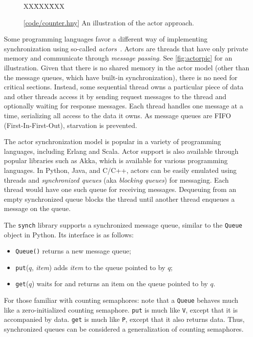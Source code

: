 \documentclass{report}
\newcommand{\harmonysource}[1]{
\begin{tabbing}
XX\=XXX\=XXX\kill
    
\end{tabbing}
}
\newcommand{\harmonylink}[1]{%
[\href{https://harmony.cs.cornell.edu/#1}{\underline{#1}}]%
}
\newenvironment{code}{
\tcolorbox
}{
\endtcolorbox
}
\begin{document}
\begin{figure}
\begin{code}
\harmonysource{counter}
\end{code}
\caption{\harmonylink{code/counter.hny} An illustration of the actor approach.}
\label{fig:actor}
\end{figure}

Some programming languages favor a different way of implementing
synchronization using so-called \emph{actors}~\cite{HBS73,Agha86}.  Actors are
threads that have only private memory and communicate through
\emph{message passing}.
See \autoref{fig:actorpic} for an illustration.
Given that there is no shared memory in the actor model (other than the message
queues, which have built-in synchronization), there is no need
for critical sections.  Instead, some sequential thread owns a particular
piece of data and other threads access it by sending request messages
to the thread and optionally waiting for response messages.  Each thread
handles one message at a time, serializing all access to the data it owns.
As message queues are FIFO (First-In-First-Out), starvation is prevented.

The actor synchronization model is popular in a variety of programming
languages, including Erlang and Scala.  Actor support is also available
through popular libraries such as Akka, which is available for various
programming languages.  In Python, Java, and C/C++,
actors can be easily emulated using threads and \emph{synchronized queues}
%
(aka \emph{blocking queues})
%
for messaging.
Each thread would have one such queue for receiving messages.
Dequeuing from an empty synchronized queue blocks the thread until
another thread enqueues a message on the queue.

The \texttt{synch} library supports a synchronized message queue,
similar to the \texttt{Queue} object in Python.
Its interface is as follows:
\begin{itemize}
\item \texttt{Queue()} returns a new message queue;
\item \texttt{put}($q$, \textit{item}) adds \textit{item} to the queue pointed to by $q$;
\item \texttt{get}($q$) waits for and returns an item on the queue pointed to by $q$.
\end{itemize}

For those familiar with counting semaphores: note that a \texttt{Queue}
behaves much like a zero-initialized counting semaphore.
\texttt{put} is much like \texttt{V}, except that it is accompanied by data.
\texttt{get} is much like \texttt{P}, except that it also returns data.
Thus, synchronized queues can be considered a generalization of
counting semaphores.
\end{document}
